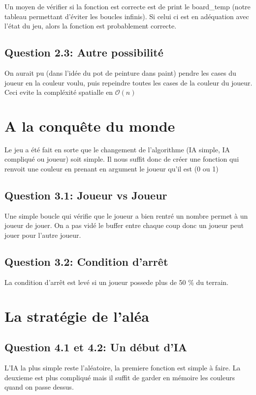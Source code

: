 \documentclass{article}
\begin{document}
    Un moyen de vérifier si la fonction est correcte est de print le board_temp (notre tableau permettant d'éviter les boucles infinis). Si celui ci est en adéquation avec l'état du jeu, alors la fonction est probablement correcte.

    \subsection{Question 2.3: Autre possibilité}
    On aurait pu (dans l'idée du pot de peinture dans paint) pendre les cases du joueur en la couleur voulu, puis repeindre toutes les cases de la couleur du joueur. Ceci evite la compléxité spatialle en $\mathcal{O}(n)$

    \section{A la conquête du monde}

    Le jeu a été fait en sorte que le changement de l'algorithme (IA simple, IA compliqué ou joueur) soit simple. Il nous suffit donc de créer une fonction qui renvoit une couleur en prenant en argument le joueur qu'il est (0 ou 1)

    \subsection{Question 3.1: Joueur vs Joueur}

    Une simple boucle qui vérifie que le joueur a bien rentré un nombre permet à un joueur de jouer. On a pas vidé le buffer entre chaque coup donc un joueur peut jouer pour l'autre joueur.

    \subsection{Question 3.2: Condition d'arrêt}

    La condition d'arrêt est levé si un joueur possede plus de 50 \% du terrain.

    \section{La stratégie de l'aléa}

    \subsection{Question 4.1 et 4.2: Un début d'IA}

    L'IA la plus simple reste l'aléatoire, la premiere fonction est simple à faire. La deuxieme est plus compliqué mais il suffit de garder en mémoire les couleurs quand on passe dessus.
\end{document}
